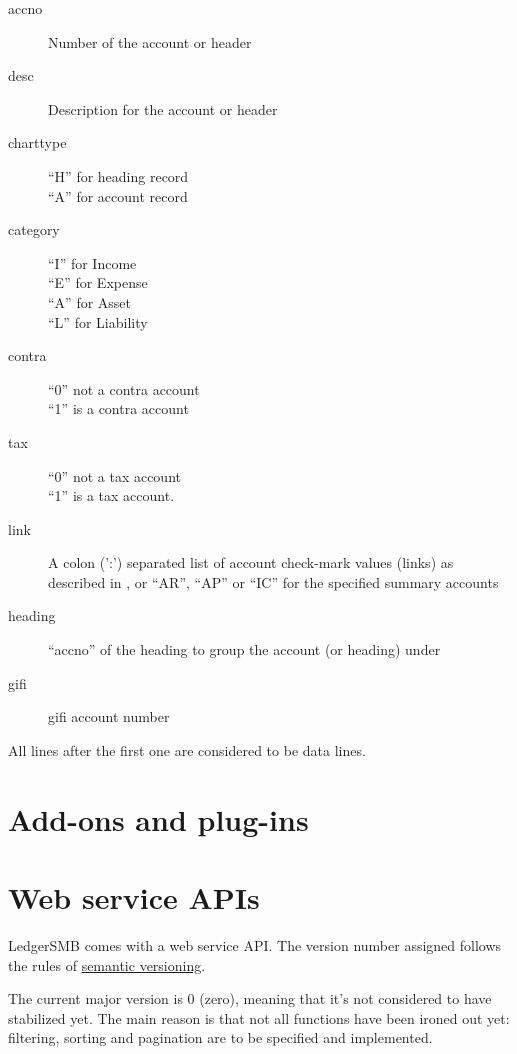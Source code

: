 \begin{description}
\item [accno] Number of the account or header
\item [desc] Description for the account or header
\item [charttype] ``H'' for heading record \\
``A'' for account record
\item [category] ``I'' for Income \\
``E'' for Expense \\
``A'' for Asset \\
``L'' for Liability
\item [contra] ``0'' not a \gls{contra} account \\
``1'' is a \gls{contra} account
\item [tax] ``0'' not a tax account \\
``1'' is a tax account.
\item [link] A colon (':') separated list of account check-mark values (links) as described
    in , or ``AR'', ``AP'' or ``IC'' for the specified summary accounts
\item [heading] ``accno'' of the heading to group the account (or heading) under
\item [gifi] \gls{gifi} account number
\end{description}

All lines after the first one are considered to be data lines.

\chapter{Add-ons and plug-ins}
\label{cha-customization-add-ons}

\chapter{Web service APIs}
\label{cha-customization-web-service-api}

LedgerSMB comes with a web service \gls{API}. 
The version number assigned follows the rules of \href{https://semver.org/}{semantic versioning}. 

The current major version is 0 (zero), meaning that it's not considered to have stabilized
yet. The main reason is that not all functions have been ironed out yet:
filtering, sorting and pagination are to be specified and implemented.

